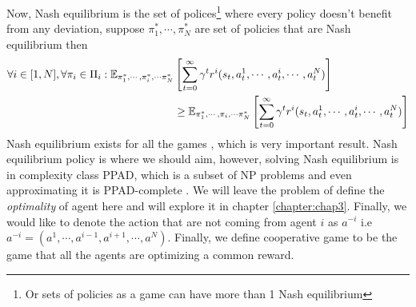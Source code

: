 Now, Nash equilibrium is the set of polices\footnote{Or sets of policies as a game can have more than 1 Nash equilibrium} where every policy doesn't benefit from any deviation, suppose $\pi_1^*, \cdots, \pi_N^*$ are set of policies that are Nash equilibrium then
\begin{equation}
\begin{aligned}
    \forall i \in [1, N], \forall \pi_i \in \Pi_i : \mathbb{E}_{\pi_1^*, \cdots, \pi_i^*, \cdots \pi_N^*} &\left[ \sum^\infty_{t=0} \gamma^t  r^i(s_t, a^1_t, \cdots, a^i_t, \cdots, a^{N}_t)  \right] \\
    &\ge \mathbb{E}_{\pi_1^*, \cdots, \pi_i, \cdots \pi_N^*} \left[ \sum^\infty_{t=0} \gamma^t  r^i(s_t, a^1_t, \cdots, a^i_t, \cdots, a^{N}_t)  \right]
\end{aligned}
\end{equation}
Nash equilibrium exists for all the games \cite{nash1950equilibrium}, which is very important result. Nash equilibrium policy is where we should aim, however, solving Nash equilibrium is in complexity class PPAD, which is a subset of NP problems \cite{daskalakis2009complexity} and even approximating it is PPAD-complete \cite{daskalakis2013complexity}. We will leave the problem of define the \textit{optimality} of agent here and will explore it in chapter \ref{chapter:chap3}. Finally, we would like to denote the action that are not coming from agent $i$ as $a^{-i}$ i.e $a^{-i} = (a^1, \cdots, a^{i-1}, a^{i+1}, \cdots, a^N)$. Finally, we define cooperative game to be the game that all the agents are optimizing a common reward.

